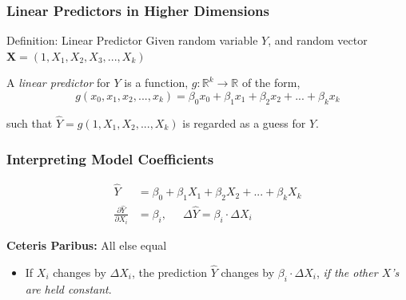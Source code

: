 \documentclass[12pt, block=fill]{beamer}
\newcommand{\bs}{\boldsymbol}
\newcommand{\R}{\mathbb{R}}
\begin{document}
   \begin{frame}
     \frametitle{Linear Predictors in Higher Dimensions}
     \begin{block}{Definition: Linear Predictor}
Given random variable $Y$, and random vector $\bs{X} = (1, X_1, X_2, X_3,...,X_k)$

     
     A \textit{linear predictor} for $Y$ is a function, $g:\R^k \rightarrow \R$ of the form,
     $$g(x_0, x_1,x_2,...,x_k) = \beta_0 x_0 + \beta_1 x_1 + \beta_2 x_2 + ... + \beta_k x_k$$
     
      such that $\hat Y = g(1, X_1, X_2,...,X_k)$ is regarded as a guess for $Y$.
      
  \end{block}
   \end{frame}
   
   
\begin{frame}
  \frametitle{Interpreting Model Coefficients}
  
  
  \begin{align*}
    \hat{Y} &=\beta_0 + \beta_1 X_1 + \beta_2 X_2 + ... + \beta_k X_k\\
    \frac{\partial \hat{Y}}{\partial X_i} &= \beta_i, \quad \ \  \Delta \hat{Y} = \beta_{i} \cdot \Delta X_{i}
  \end{align*}
     \begin{block}{   \textbf{Ceteris Paribus:} All else equal}
    \begin{itemize}
    \item If $X_{i}$ changes by $\Delta X_{i}$, the prediction $\hat{Y}$ changes by $\beta_{i} \cdot \Delta X_{i}$, \textit{if the other $X$'s are held constant}.
    \end{itemize} 
 
  \end{block} 
\end{frame}
  
\end{document}
